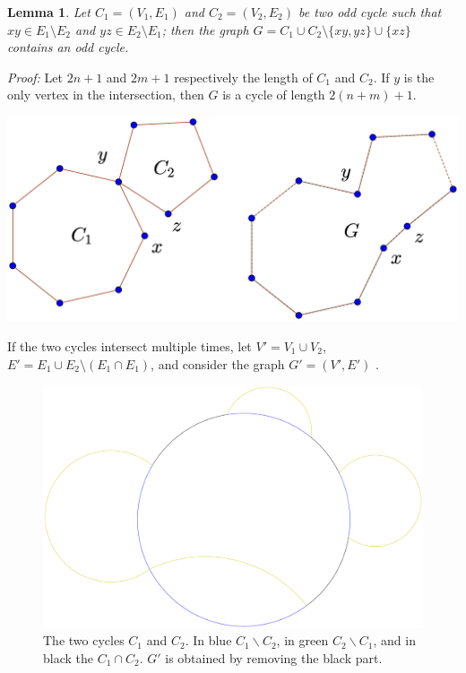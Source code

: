 \documentclass[a4paper,12pt,oneside]{book}
\newtheorem{lemma}[theorem]{Lemma}
\begin{document}
\vspace*{-0.1cm}
\begin{lemma}\label{tech-lemma-graph}
Let $C_1=(V_1,E_1)$ and $C_2=(V_2,E_2)$ be two odd cycle such that $xy\in E_1\setminus E_2$ and 
$yz\in E_2\setminus E_1$;  then the graph $G=C_1\cup C_2\setminus\{xy,yz\}\cup\{xz\}$ contains an odd cycle.
\end{lemma}\textit{Proof: }Let $2n+1$ and $2m+1$ respectively the length of $C_1$ and $C_2$. If $y$ is the only vertex in the intersection, then  $G$ is a cycle of length $2(n+m)+1$. 
\vspace*{-0.1cm}
\begin{center}
\includegraphics[scale=0.2]{oddcycles1.eps}
\end{center}


\newpage\noindent
If the two cycles intersect multiple times, let $V'=V_1\cup V_2$, $E'=E_1\cup E_2\setminus (E_1\cap E_1)$, and consider the graph $G'=(V',E')$ .

\begin{figure}[h]
\centering
\includegraphics[scale=0.11]{oddcycles-interceptions.eps}
\caption{The two cycles $C_1$ and $C_2$. In blue $C_1 \backslash C_2 $, in green $C_2\backslash C_1 $, and in black the $C_1\cap C_2$. $G'$ is obtained by removing the black part.} 
\end{figure}
\end{document}
